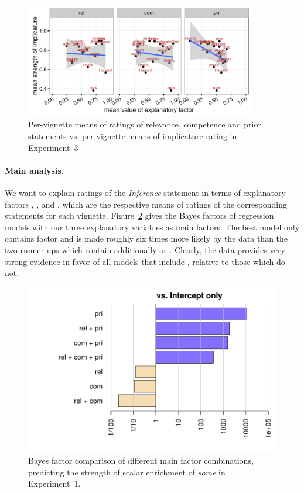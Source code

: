 \documentclass[12pt]{article}
\begin{document}
\begin{figure}
  \centering

  \includegraphics[width = 0.9\textwidth]{pics/correlationExp3.pdf}
  
  \caption{Per-vignette means of ratings of relevance, competence and prior statements
    vs. per-vignette means of implicature rating in Experiment~3}
  \label{fig:correlationsExp3}
\end{figure}

\paragraph{Main analysis.} We want to explain ratings of the \emph{Inference}-statement in
terms of explanatory factors \rel, \pri, and \com, which are the respective means of ratings of
the corresponding statements for each vignette. Figure~\ref{fig:BFsExp3} gives the Bayes
factors of regression models with our three explanatory variables as main factors. The best
model only contains factor \pri and is made roughly six times more likely by the data than the
two runner-ups which contain additionally \rel or \com. Clearly, the data provides very strong
evidence in favor of all models that include \pri, relative to those which do not.

\begin{figure}
  \centering
  \includegraphics[width = 0.8 \textwidth]{pics/bfsAllExp3.pdf}
  \caption{Bayes factor comparison of different main factor combinations, predicting the
    strength of scalar enrichment of \emph{some} in Experiment~1.}
  \label{fig:BFsExp3}
\end{figure}
\end{document}

